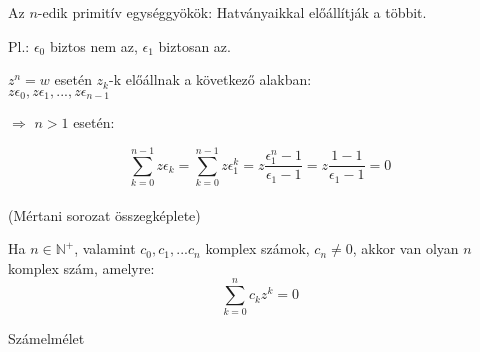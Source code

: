 \begin{frame}
\begin{tcolorbox}[title={Def.: $n$-edik primitív egységgyökök}]
Az $n$-edik primitív egységgyökök: Hatványaikkal előállítják a többit.\\
\mmedskip

Pl.: ${\epsilon}_0$ biztos nem az, ${\epsilon}_1$ biztosan az.\\
\mmedskip

$z^n = w$ esetén $z_k$-k előállnak a következő alakban:\\
$z{\epsilon}_0, z{\epsilon}_1, ..., z{\epsilon}_{n - 1}$\\
\mmedskip

$\Rightarrow$ $n > 1$ esetén:\\
\mmedskip

$$\sum_{k = 0}^{n - 1} z{\epsilon}_k = \sum_{k = 0}^{n - 1} z{\epsilon}^k_1 = z\frac{{\epsilon}_1^n - 1}{{\epsilon}_1 - 1} = z\frac{1 - 1}{{\epsilon}_1 - 1} = 0$$\\
(Mértani sorozat összegképlete)
\end{tcolorbox}
\end{frame}

\begin{frame}
\begin{tcolorbox}[title={Tétel: Az algebra alaptétele}]
Ha $n \in \mathbb{N}^+$, valamint $c_0, c_1, ... c_n$ komplex számok, $c_n \neq 0$, akkor van olyan $n$ komplex szám, amelyre:\\
$$\sum_{k = 0}^n c_kz^k = 0$$
\end{tcolorbox}
\end{frame}

\begin{frame}[plain]
\begin{tcolorbox}[center, colback={myyellow}, coltext={black}, colframe={myyellow}]
    {\RHuge Számelmélet}
    \mmedskip
\end{tcolorbox}
\end{frame}

